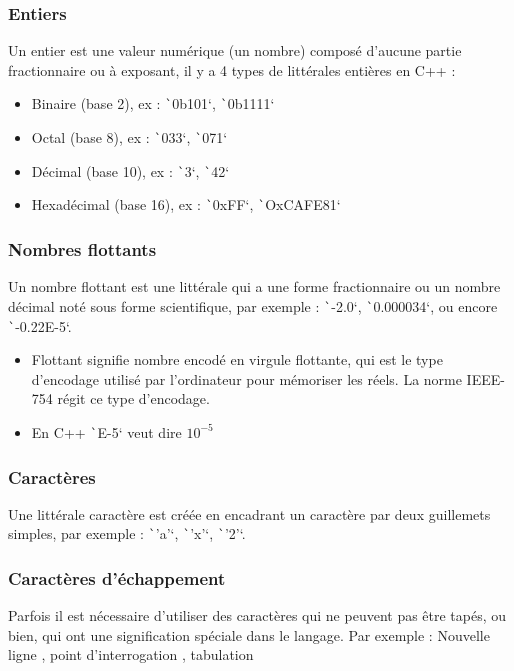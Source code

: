\documentclass[10pt]{article}
\begin{document}
\subsubsection{Entiers}
Un entier est une valeur numérique (un nombre) composé d'aucune partie fractionnaire ou à exposant, il y a 4 types de littérales entières en C++ :

\begin{itemize}
    \item Binaire (base 2), ex : \texttt`0b101`, \texttt`0b1111`
    \item Octal (base 8), ex : \texttt`033`, \texttt`071`
    \item Décimal (base 10), ex : \texttt`3`, \texttt`42` 
    \item Hexadécimal (base 16), ex : \texttt`0xFF`, \texttt`OxCAFE81`  
\end{itemize}

\subsubsection{Nombres flottants}
Un nombre flottant est une littérale qui a une forme fractionnaire ou un nombre décimal noté sous forme scientifique, par exemple :
\texttt`-2.0`, \texttt`0.000034`, ou encore \texttt`-0.22E-5`.

\begin{noteblock}
    \begin{itemize}
        \item Flottant signifie nombre encodé en virgule flottante, qui est le type d'encodage utilisé par l'ordinateur pour mémoriser les réels. La norme IEEE-754 régit ce type d'encodage.
        \item En C++ \texttt`E-5`  veut dire  $10^{-5}$
    \end{itemize}
\end{noteblock}

\subsubsection{Caractères}
Une littérale caractère est créée en encadrant un caractère par deux guillemets simples, par exemple : \texttt`'a'`, \texttt`'x'`, \texttt`'2'`. 

\subsubsection{Caractères d'échappement}
Parfois il est nécessaire d'utiliser des caractères qui ne peuvent pas être tapés, ou bien, qui ont une signification spéciale dans le langage. Par exemple : Nouvelle ligne \keys{\return}, point d'interrogation , tabulation \keys{\tab}
\end{document}
